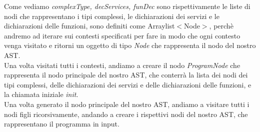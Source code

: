 \documentclass[../../main.tex]{subfiles}
\begin{document}
Come vediamo \textit{complexType, decServices, funDec} sono rispettivamente le liste di nodi che rappresentano i tipi complessi, le dichiarazioni dei servizi e le dichiarazioni delle funzioni, sono definiti come Arraylist$<$Node$>$, perchè andremo ad iterare sui contesti specificati per fare in modo che ogni contesto venga visitato e ritorni un oggetto di tipo \textit{Node} che rappresenta il nodo del nostro AST.\\
Una volta visitati tutti i contesti, andiamo a creare il nodo \textit{ProgramNode} che rappresenta il nodo principale del nostro AST, che conterrà la lista dei nodi dei tipi complessi, delle dichiarazioni dei servizi e delle dichiarazioni delle funzioni, e la chiamata iniziale \textit{init}.\\
Una volta generato il nodo principale del nostro AST, andiamo a visitare tutti i nodi figli ricorsivamente, andando a creare i rispettivi nodi del nostro AST, che rappresentano il programma in input.\\
\end{document}
